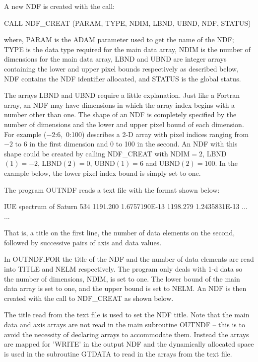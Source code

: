 \documentclass[twoside,11pt,nolof]{starlink}
\begin{document}
A new NDF is created with the call:
\begin{terminalv}
      CALL NDF_CREAT (PARAM, TYPE, NDIM, LBND, UBND, NDF, STATUS)
\end{terminalv}
where, PARAM is the ADAM parameter used to get the name of the NDF;
TYPE is the data type required for the  main data array,
NDIM is the number of dimensions for the main data array,
LBND and UBND are integer arrays containing  the lower and upper pixel bounds
respectively as described below,
NDF contains  the NDF identifier allocated, and STATUS is the global status.

The arrays LBND and UBND require a little explanation.
Just like a Fortran array, an NDF may have dimensions in which the
array index begins with a number other than one.
The shape of an NDF is completely specified by the number of dimensions
and the lower and upper pixel bound of each dimension.
For example ($-$2:6,~0:100) describes a 2-D array with pixel indices
ranging from $-2$ to 6 in the first dimension and 0 to 100 in the second.
An NDF with this shape could be created by calling NDF\_CREAT with
NDIM$=2$, LBND$(1)=-2$, LBND$(2)=0$, UBND$(1)=6$ and UBND$(2)=100$.
In the example below, the lower pixel index bound is simply set  to
one.

The program OUTNDF reads a text file with
the format  shown below:
\begin{terminalv}
IUE spectrum of Saturn
534
   1191.200      1.6757190E-13
   1198.279      1.2435831E-13
   ...            ...
\end{terminalv}
That is, a title on the first line, the number of data elements on the
second, followed by successive pairs of axis and data values.

In OUTNDF.FOR the title of the NDF and the number of data elements
are read into TITLE and NELM respectively.
The program only deals with 1-d data so the
number of dimensions, NDIM, is set to one.
The lower bound of the main data array  is set to one,
and the upper bound is set to NELM.
An NDF is then created with the call to NDF\_CREAT as shown below.

The title read from the text file is used to set the NDF title.
Note that the main data and axis arrays are not read in the main subroutine
OUTNDF --  this is to avoid the necessity of declaring arrays to accommodate
them.
Instead the arrays are mapped for 'WRITE'  in the output NDF
and the dynamically allocated space is used in
the subroutine GTDATA to read in the arrays from
the text file.
\end{document}
